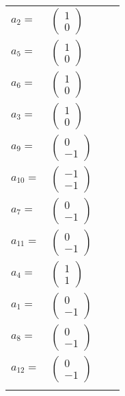 \documentclass[1p]{elsarticle_modified}
\theoremstyle{definition}
\begin{document}
\begin{tabular}{m{7pt} m{180pt} m{7pt} m{180pt} }
\flushright $a_{2}=$&$\begin{pmatrix}1\\0\end{pmatrix}$ \\
\flushright $a_{5}=$&$\begin{pmatrix}1\\0\end{pmatrix}$ \\
\flushright $a_{6}=$&$\begin{pmatrix}1\\0\end{pmatrix}$ \\
\flushright $a_{3}=$&$\begin{pmatrix}1\\0\end{pmatrix}$ \\
\flushright $a_{9}=$&$\begin{pmatrix}0\\-1\end{pmatrix}$ \\
\flushright $a_{10}=$&$\begin{pmatrix}-1\\-1\end{pmatrix}$ \\
\flushright $a_{7}=$&$\begin{pmatrix}0\\-1\end{pmatrix}$ \\
\flushright $a_{11}=$&$\begin{pmatrix}0\\-1\end{pmatrix}$ \\
\flushright $a_{4}=$&$\begin{pmatrix}1\\1\end{pmatrix}$ \\
\flushright $a_{1}=$&$\begin{pmatrix}0\\-1\end{pmatrix}$ \\
\flushright $a_{8}=$&$\begin{pmatrix}0\\-1\end{pmatrix}$ \\
\flushright $a_{12}=$&$\begin{pmatrix}0\\-1\end{pmatrix}$\\&\end{tabular}
\end{document}
